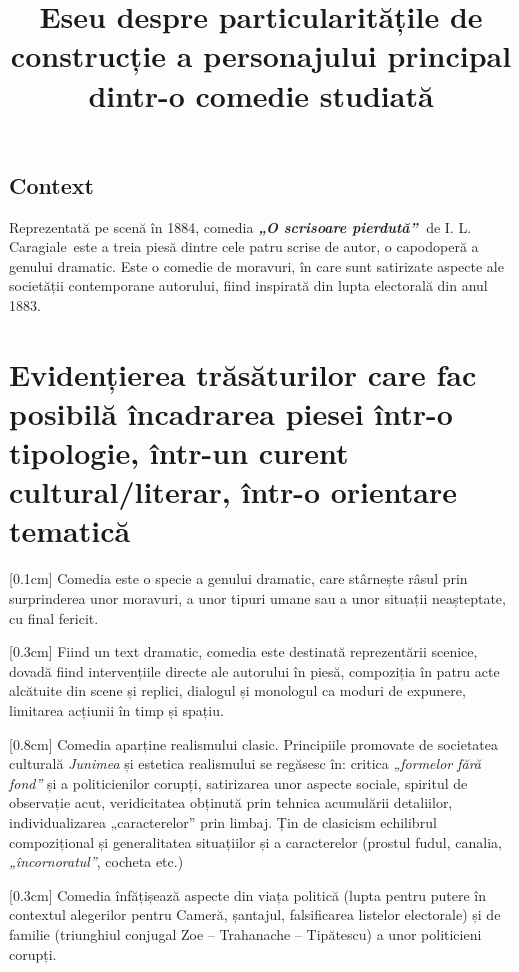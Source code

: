 \documentclass[
12pt,                        %
a4paper                      %
]{article}
\title{Eseu despre particularitățile de construcție a personajului principal dintr-o comedie studiată}
\date{}   %
\author{} %
\newcommand{\operatitle}{\textbf{\textit{„O scrisoare pierdută”\ }}} %
\newcommand{\operaauthor}{I. L. Caragiale\ } %
\begin{document}
\maketitle %



\subsection{Context}

Reprezentată pe scenă în 1884, comedia \operatitle de \operaauthor este a treia piesă dintre cele patru scrise de autor, o capodoperă a genului dramatic. Este o comedie de moravuri, în care sunt satirizate aspecte ale societății contemporane autorului, fiind inspirată din lupta electorală din anul 1883.

\section{Evidențierea trăsăturilor care fac posibilă încadrarea piesei într-o tipologie, într-un curent cultural/literar, într-o orientare tematică}

[0.1cm]
Comedia este o specie a genului dramatic, care stârnește râsul prin surprinderea unor moravuri, a unor tipuri umane sau a unor situații neașteptate, cu final fericit.

[0.3cm]
Fiind un text dramatic, comedia este destinată reprezentării scenice, dovadă fiind intervențiile directe ale autorului în piesă, compoziția în patru acte alcătuite din scene și replici, dialogul și monologul ca moduri de expunere, limitarea acțiunii în timp și spațiu.

[0.8cm]
Comedia aparține realismului clasic. Principiile promovate de societatea culturală \textit{Junimea} și estetica realismului se regăsesc în: critica \textit{„formelor fără fond”} și a politicienilor corupți, satirizarea unor aspecte sociale, spiritul de observație acut, veridicitatea obținută prin tehnica acumulării detaliilor, individualizarea „caracterelor” prin limbaj. Țin de clasicism echilibrul compozițional și generalitatea situațiilor și a caracterelor (prostul fudul, canalia, \textit{„încornoratul”}, cocheta etc.)

[0.3cm]
Comedia înfățișează aspecte din viața politică (lupta pentru putere în contextul alegerilor pentru Cameră, șantajul, falsificarea listelor electorale) și de familie (triunghiul conjugal Zoe -- Trahanache -- Tipătescu) a unor politicieni corupți.
\end{document}
